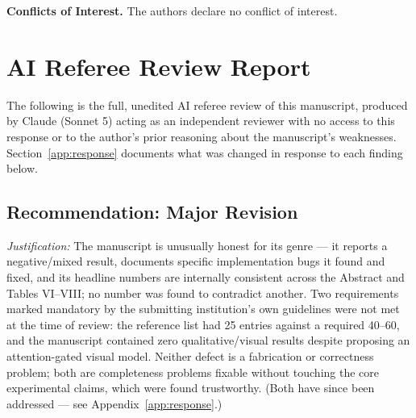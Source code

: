 \documentclass[conference]{IEEEtran}
\begin{document}
\textbf{Conflicts of Interest.} The authors declare no conflict
of interest.

\appendix

\section{AI Referee Review Report}
\label{app:review}
The following is the full, unedited AI referee review of this
manuscript, produced by Claude (Sonnet 5) acting as an independent
reviewer with no access to this response or to the author's prior
reasoning about the manuscript's weaknesses. Section~\ref{app:response}
documents what was changed in response to each finding below.

\subsection*{Recommendation: Major Revision}
\textit{Justification:} The manuscript is unusually honest for its
genre --- it reports a negative/mixed result, documents specific
implementation bugs it found and fixed, and its headline numbers
are internally consistent across the Abstract and Tables
VI--VIII; no number was found to contradict another. Two
requirements marked mandatory by the submitting institution's own
guidelines were not met at the time of review: the reference list
had 25 entries against a required 40--60, and the manuscript
contained zero qualitative/visual results despite proposing an
attention-gated visual model. Neither defect is a fabrication or
correctness problem; both are completeness problems fixable
without touching the core experimental claims, which were found
trustworthy. (Both have since been addressed --- see
Appendix~\ref{app:response}.)
\end{document}
